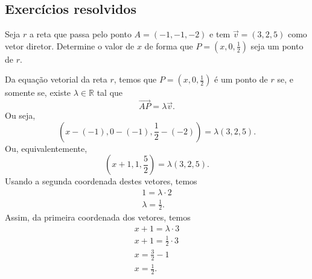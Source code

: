 \subsection*{Exercícios resolvidos}

\begin{exeresol}
  Seja $r$ a reta que passa pelo ponto $A = (-1,-1,-2)$ e tem $\vec{v} = (3,2,5)$ como vetor diretor. Determine o valor de $x$ de forma que $P = \left(x, 0, \frac{1}{2}\right)$ seja um ponto de $r$.
\end{exeresol}
\begin{resol}
  Da equação vetorial da reta $r$, temos que $P = \left(x,0,\frac{1}{2}\right)$ é um ponto de $r$ se, e somente se, existe $\lambda\in\mathbb{R}$ tal que
  \begin{equation}
    \overrightarrow{AP} = \lambda\vec{v}.
  \end{equation}
  Ou seja,
  \begin{equation}
    \left(x-(-1),0-(-1),\frac{1}{2}-(-2)\right) = \lambda (3,2,5).
  \end{equation}
  Ou, equivalentemente,
  \begin{equation}
    \left(x+1,1,\frac{5}{2}\right) = \lambda (3,2,5).
  \end{equation}
  Usando a segunda coordenada destes vetores, temos
  \begin{gather}
    1 = \lambda\cdot 2\\
    \lambda = \frac{1}{2}.
  \end{gather}
  Assim, da primeira coordenada dos vetores, temos
  \begin{gather}
    x+1 = \lambda\cdot 3 \\
    x+1 = \frac{1}{2}\cdot 3\\
    x = \frac{3}{2}-1\\
    x= \frac{1}{2}.
  \end{gather}
\end{resol}

